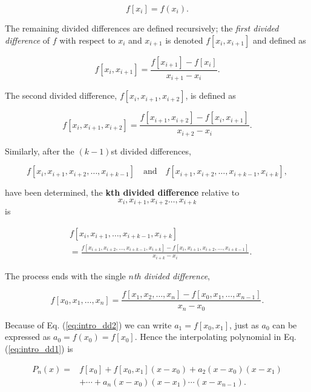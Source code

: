 \documentclass[preprint,12pt]{elsarticle}
\begin{document}
\begin{equation}
    f[x_i]=f(x_i).
\end{equation}

The remaining divided differences are defined recursively; the \textit{first divided difference} of $f$ with respect to $x_i$ and $x_{i+1}$ is denoted $f[x_i,x_{i+1}]$ and defined as 

\begin{equation}
    f[x_i,x_{i+1}]=\frac{f[x_{i+1}]-f[x_i]}{x_{i+1}-x_i}.
\end{equation}

The second divided difference, $f[x_i,x_{i+1},x_{i+2}]$, is defined as 

$$
f[x_i,x_{i+1},x_{i+2}]=\frac{f[x_{i+1},x_{i+2}]-f[x_{i},x_{i+1}]}{x_{i+2}-x_i}.
$$

Similarly, after the $(k-1)$st divided differences, 

$$
f[x_i,x_{i+1},x_{i+2},\dots,x_{i+k-1}]\quad \mathrm{and}\quad f[x_{i+1},x_{i+2},\dots,x_{i+k-1},x_{i+k}],
$$

have been determined, the \textbf{kth divided difference} relative to $$x_i,x_{i+1},x_{i+2}\dots,x_{i+k}$$
is 

\begin{equation}
    \begin{split}
        & f[x_{i},x_{i+1},\dots,x_{i+k-1},x_{i+k}]\\
        & =\frac{f[x_{i+1},x_{i+2},\dots,x_{i+k-1},x_{i+k}]-f[x_i,x_{i+1},x_{i+2},\dots,x_{i+k-1}]}{x_{i+k}-x_i}.
    \end{split}
\end{equation}

The process ends with the single \textit{$n$th divided difference},

$$
f[x_0,x_1,\dots,x_n]=\frac{f[x_1,x_2,\dots,x_n]-f[x_0,x_1,\dots,x_{n-1}]}{x_{n}-x_0}.
$$

Because of Eq. (\ref{eq:intro_dd2}) we can write $a_1 = f[x_0,x_1]$, just as $a_0$ can be expressed as $a_0 = f(x_0) = f[x_0]$. Hence the interpolating polynomial in Eq. (\ref{eq:intro_dd1}) is 

\begin{equation}
    \begin{split}
        P_{n}(x)= & f[x_0]+f[x_0,x_1](x-x_0)+a_{2}(x-x_0)(x-x_1)\\
        & +\cdots+a_{n}(x-x_0)(x-x_1)\cdots(x-x_{n-1}).
    \end{split}
\end{equation}
\end{document}
